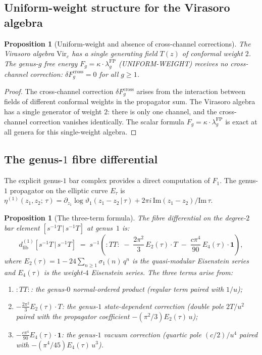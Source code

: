 \documentclass[11pt,reqno]{amsart}
\newtheorem{proposition}[theorem]{Proposition}
\theoremstyle{definition}
\theoremstyle{remark}
\begin{document}
\subsection{Uniform-weight structure for the Virasoro algebra}

\begin{proposition}[Uniform-weight and absence of cross-channel corrections]
\label{prop:uniform-weight}
The Virasoro algebra $\mathrm{Vir}_c$ has a single generating field
$T(z)$ of conformal weight $2$. The genus-$g$ free energy
$F_g = \kappa \cdot \lambda_g^{\mathrm{FP}}$ (UNIFORM-WEIGHT)
receives no cross-channel correction:
$\delta F_g^{\mathrm{cross}} = 0$ for all\/ $g \ge 1$.
\end{proposition}

\begin{proof}
The cross-channel correction $\delta F_g^{\mathrm{cross}}$
arises from the interaction between fields of different conformal
weights in the propagator sum. The Virasoro algebra has a single
generator of weight $2$: there is only one channel, and the
cross-channel correction vanishes identically. The scalar
formula $F_g = \kappa \cdot \lambda_g^{\mathrm{FP}}$ is exact
at all genera for this single-weight algebra.
\end{proof}

\subsection{The genus-$1$ fibre differential}

The explicit genus-$1$ bar complex provides a direct computation
of $F_1$. The genus-$1$ propagator on the elliptic curve $E_\tau$
is $\eta^{(1)}(z_1, z_2;\,\tau)
= \partial_{z_1}\log\vartheta_1(z_1 - z_2 \,|\, \tau)
+ 2\pi i\,\mathrm{Im}(z_1 - z_2)/\mathrm{Im}\,\tau$.

\begin{proposition}[The three-term formula]
\label{prop:three-term}
The fibre differential on the degree-$2$ bar element
$[s^{-1}T \,|\, s^{-1}T]$ at genus~$1$ is:
\begin{equation}\label{eq:three-term}
d_{\mathrm{fib}}^{(1)}[s^{-1}T \,|\, s^{-1}T]
\;=\;
s^{-1}\!\left(
 {:}TT{:}
 \;-\; \frac{2\pi^2}{3}\,E_2(\tau)\cdot T
 \;-\; \frac{c\pi^4}{90}\,E_4(\tau)\cdot \mathbf{1}
\right)\!,
\end{equation}
where $E_2(\tau) = 1 - 24\sum_{n \ge 1}\sigma_1(n)\,q^n$ is the
quasi-modular Eisenstein series and $E_4(\tau)$ is the weight-$4$
Eisenstein series. The three terms arise from:
\begin{enumerate}[label=\textup{(\roman*)}]
\item ${:}TT{:}$: the genus-$0$ normal-ordered product (regular
  term paired with $1/u$);
\item $-\frac{2\pi^2}{3}E_2(\tau) \cdot T$: the genus-$1$
  state-dependent correction (double pole $2T/u^2$ paired with
  the propagator coefficient $-(\pi^2/3)E_2(\tau)\,u$);
\item $-\frac{c\pi^4}{90}E_4(\tau) \cdot \mathbf{1}$: the
  genus-$1$ vacuum correction (quartic pole $(c/2)/u^4$ paired
  with $-(\pi^4/45)E_4(\tau)\,u^3$).
\end{enumerate}
\end{proposition}
\end{document}
